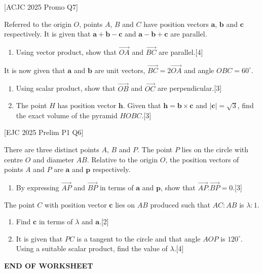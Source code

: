 \documentclass[a4paper,11pt,oneside]{book}
\newcounter{wq}[section]
\newcommand{\Q}[1]{\par\needspace{5\baselineskip}\medskip\stepcounter{wq}\noindent\textbf{\thewq}\quad #1\par}
\begin{document}
\Q{\textcolor{black!60}{\small[ACJC 2025 Promo Q7]}\par\smallskip Referred to the origin $O$, points $A$, $B$ and $C$ have position vectors $\mathbf a$, $\mathbf b$ and $\mathbf c$ respectively. It is given that $\mathbf a+\mathbf b-\mathbf c$ and $\mathbf a-\mathbf b+\mathbf c$ are parallel.\begin{enumerate}[label=\textbf{(\alph*)},leftmargin=2.2em,itemsep=3pt]\item Using vector product, show that $\overrightarrow{OA}$ and $\overrightarrow{BC}$ are parallel.\hfill[4]\end{enumerate}It is now given that $\mathbf a$ and $\mathbf b$ are unit vectors, $\overrightarrow{BC}=2\overrightarrow{OA}$ and angle $OBC=60^\circ$.\begin{enumerate}[label=\textbf{(\alph*)},leftmargin=2.2em,itemsep=3pt,start=2]\item Using scalar product, show that $\overrightarrow{OB}$ and $\overrightarrow{OC}$ are perpendicular.\hfill[3]\item The point $H$ has position vector $\mathbf h$. Given that $\mathbf h=\mathbf b\times\mathbf c$ and $|\mathbf c|=\sqrt3$, find the exact volume of the pyramid $HOBC$.\hfill[3]\par[The volume of a pyramid is $\frac13\times$ base area $\times$ height.]\end{enumerate}}
\Q{\textcolor{black!60}{\small[EJC 2025 Prelim P1 Q6]}\par\smallskip There are three distinct points $A$, $B$ and $P$. The point $P$ lies on the circle with centre $O$ and diameter $AB$. Relative to the origin $O$, the position vectors of points $A$ and $P$ are $\mathbf a$ and $\mathbf p$ respectively.\begin{enumerate}[label=\textbf{(\alph*)},leftmargin=2.2em,itemsep=3pt]\item By expressing $\overrightarrow{AP}$ and $\overrightarrow{BP}$ in terms of $\mathbf a$ and $\mathbf p$, show that $\overrightarrow{AP}.\overrightarrow{BP}=0$.\hfill[3]\end{enumerate}The point $C$ with position vector $\mathbf c$ lies on $AB$ produced such that $AC:AB$ is $\lambda:1$.\begin{enumerate}[label=\textbf{(\alph*)},leftmargin=2.2em,itemsep=3pt,start=2]\item Find $\mathbf c$ in terms of $\lambda$ and $\mathbf a$.\hfill[2]\item It is given that $PC$ is a tangent to the circle and that angle $AOP$ is $120^\circ$. Using a suitable scalar product, find the value of $\lambda$.\hfill[4]\end{enumerate}}
\par\vspace{\baselineskip}\begin{center}\textbf{END OF WORKSHEET}\end{center}
\end{document}
